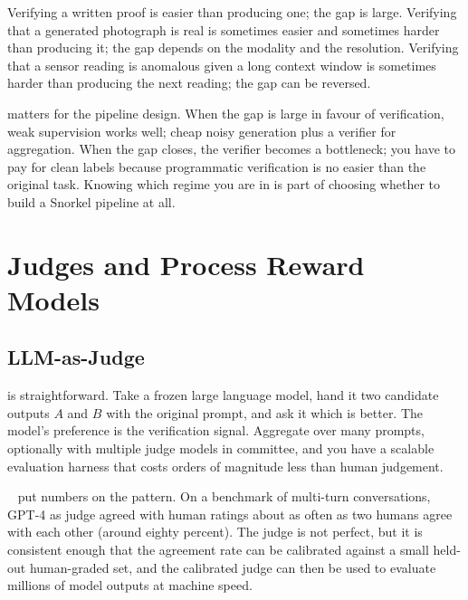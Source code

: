  Verifying a written proof is easier than producing one; the gap is large. Verifying that a generated photograph is real is sometimes easier and sometimes harder than producing it; the gap depends on the modality and the resolution. Verifying that a sensor reading is anomalous given a long context window is sometimes harder than producing the next reading; the gap can be reversed.

 matters for the pipeline design. When the gap is large in favour of verification, weak supervision works well; cheap noisy generation plus a verifier for aggregation. When the gap closes, the verifier becomes a bottleneck; you have to pay for clean labels because programmatic verification is no easier than the original task. Knowing which regime you are in is part of choosing whether to build a Snorkel pipeline at all.


\newpage
\section{Judges and Process Reward Models}


\subsection{LLM-as-Judge}

 is straightforward. Take a frozen large language model, hand it two candidate outputs $A$ and $B$ with the original prompt, and ask it which is better. The model's preference is the verification signal. Aggregate over many prompts, optionally with multiple judge models in committee, and you have a scalable evaluation harness that costs orders of magnitude less than human judgement.

~\cite{Zheng2023JudgeBench} put numbers on the pattern. On a benchmark of multi-turn conversations, GPT-4 as judge agreed with human ratings about as often as two humans agree with each other (around eighty percent). The judge is not perfect, but it is consistent enough that the agreement rate can be calibrated against a small held-out human-graded set, and the calibrated judge can then be used to evaluate millions of model outputs at machine speed.

